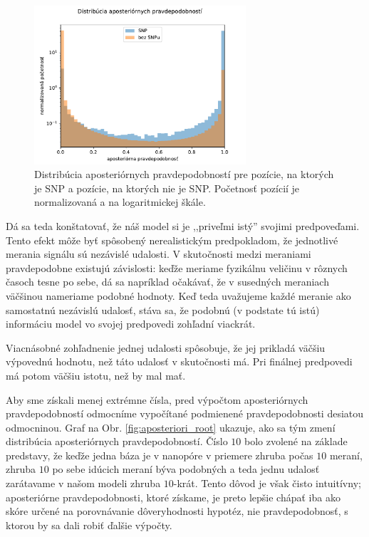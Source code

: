 \begin{figure}[t]
\centerline{\includegraphics[width=0.7\textwidth]{plots/0_noroot_eqbins}}
\caption[Aposteriórne pravdepodobnosti pre pozície so SNPom a pozície bez SNPu]{Distribúcia aposteriórnych pravdepodobností pre pozície, na ktorých je SNP a pozície, na ktorých nie je SNP. Početnosť
pozícií je normalizovaná a na logaritmickej škále.}
\label{fig:aposteriori_noroot}
\end{figure}


Dá sa teda konštatovať, že náš model si je ,,priveľmi istý'' svojimi predpoveďami. Tento efekt môže
byť spôsobený nerealistickým predpokladom, že jednotlivé merania 
signálu sú nezávislé udalosti. V skutočnosti medzi meraniami pravdepodobne existujú závislosti: keďže
meriame fyzikálnu veličinu v rôznych časoch tesne po sebe, dá sa napríklad očakávať, že v susedných
meraniach väčšinou nameriame podobné hodnoty. Keď teda uvažujeme každé meranie ako samostatnú nezávislú 
udalosť, stáva sa, že podobnú (v podstate tú istú) informáciu model vo svojej predpovedi zohľadní
viackrát.

Viacnásobné zohľadnenie jednej udalosti spôsobuje, že jej prikladá väčšiu výpovednú hodnotu, než táto
udalosť v skutočnosti má. Pri finálnej predpovedi má potom väčšiu istotu, než by mal mať.

Aby sme získali menej extrémne čísla, pred výpočtom aposteriórnych pravdepodobností odmocníme vypočítané 
podmienené pravdepodobnosti desiatou odmocninou. Graf na Obr. \ref{fig:aposteriori_root} ukazuje, ako sa tým
zmení distribúcia aposteriórnych pravdepodobností. Číslo $10$ bolo zvolené na základe predstavy, že
keďže jedna báza je v nanopóre v priemere zhruba počas $10$ meraní, zhruba $10$ po sebe idúcich meraní 
býva podobných a teda jednu udalosť zarátavame v našom modeli zhruba $10$-krát. Tento dôvod je však
čisto intuitívny; aposteriórne pravdepodobnosti, ktoré získame, je preto lepšie chápať iba ako skóre 
určené na porovnávanie dôveryhodnosti hypotéz, nie pravdepodobnosť, s ktorou by sa dali robiť ďalšie 
výpočty. 

